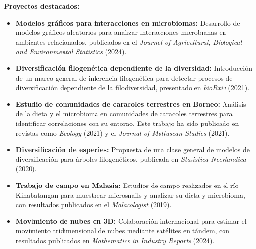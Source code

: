 \documentclass[11pt,a4paper]{article}
\begin{document}
{\textbf{Proyectos destacados:}  

        
\begin{itemize}
    \item \textbf{Modelos gráficos para interacciones en microbiomas:} Desarrollo de modelos gráficos aleatorios para analizar interacciones microbianas en ambientes relacionados, publicados en el \textit{Journal of Agricultural, Biological and Environmental Statistics} (2024).
    
    \item \textbf{Diversificación filogenética dependiente de la diversidad:} Introducción de un marco general de inferencia filogenética para detectar procesos de diversificación dependiente de la filodiversidad, presentado en \textit{bioRxiv} (2021).
    
    \item \textbf{Estudio de comunidades de caracoles terrestres en Borneo:} Análisis de la dieta y el microbioma en comunidades de caracoles terrestres para identificar correlaciones con su entorno. Este trabajo ha sido publicado en revistas como \textit{Ecology} (2021) y el \textit{Journal of Molluscan Studies} (2021).
    
    \item \textbf{Diversificación de especies:} Propuesta de una clase general de modelos de diversificación para árboles filogenéticos, publicada en \textit{Statistica Neerlandica} (2020).
    
    \item \textbf{Trabajo de campo en Malasia:} Estudios de campo realizados en el río Kinabatangan para muestrear microsnails y analizar su dieta y microbioma, con resultados publicados en el \textit{Malacologist} (2019).
    
    \item \textbf{Movimiento de nubes en 3D:} Colaboración internacional para estimar el movimiento tridimensional de nubes mediante satélites en tándem, con resultados publicados en \textit{Mathematics in Industry Reports} (2024).


   
\end{itemize}



}
\end{document}
